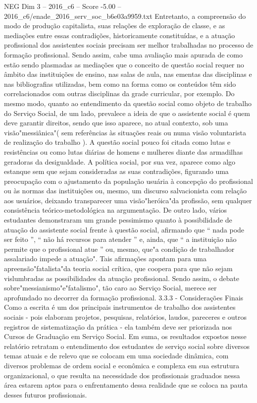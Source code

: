 \begin{textsample}{NEG Dim 3 – 2016\_c6 – Score -5.00 – 2016\_c6/enade\_2016\_serv\_soc\_b6e03a9959.txt}
Entretanto, a compreensão do modo de produção capitalista, suas relações de exploração de classe, e as mediações entre essas contradições, historicamente constituídas, e a atuação profissional dos assistentes sociais precisam ser melhor trabalhadas no processo de formação profissional.
Sendo assim, cabe uma avaliação mais apurada de como estão sendo plasmadas as mediações que o conceito de questão social requer no âmbito das instituições de ensino, nas salas de aula, nas ementas das disciplinas e nas bibliografias utilizadas, bem como na forma como os conteúdos têm sido correlacionados com outras disciplinas da grade curricular, por exemplo.
Do mesmo modo, quanto ao entendimento da questão social como objeto de trabalho do Serviço Social, de um lado, prevalece a ideia de que o assistente social é quem deve garantir direitos, sendo que isso aparece, no atual contexto, sob uma visão"messiânica"( sem referências às situações reais ou numa visão voluntarista de realização do trabalho ).
A questão social pouco foi citada como lutas e resistências ou como lutas diárias de homens e mulheres diante das armadilhas geradoras da desigualdade.
A política social, por sua vez, aparece como algo estanque sem que sejam consideradas as suas contradições, figurando uma preocupação com o ajustamento da população usuária à concepção do profissional ou às normas das instituições ou, mesmo, um discurso salvacionista com relação aos usuários, deixando transparecer uma visão"heróica"da profissão, sem qualquer consistência teórico-metodológica na argumentação.
De outro lado, vários estudantes demonstraram um grande pessimismo quanto à possibilidade de atuação do assistente social frente à questão social, afirmando que “ nada pode ser feito ”, “ não há recursos para atender ” e, ainda, que “ a instituição não permite que o profissional atue ” ou, mesmo, que"a condição de trabalhador assalariado impede a atuação".
Tais afirmações apontam para uma apreensão"fatalista"da teoria social crítica, que coopera para que não sejam vislumbradas as possibilidades da atuação profissional.
Sendo assim, o debate sobre"messianismo"e"fatalismo", tão caro ao Serviço Social, merece ser aprofundado no decorrer da formação profissional. 3.3.3 - Considerações Finais Como a escrita é um dos principais instrumentos de trabalho dos assistentes sociais - pois elaboram projetos, pesquisas, relatórios, laudos, pareceres e outros registros de sistematização da prática - ela também deve ser priorizada nos Cursos de Graduação em Serviço Social.
Em suma, os resultados expostos nesse relatório retratam o entendimento dos estudantes de serviço social sobre diversos temas atuais e de relevo que se colocam em uma sociedade dinâmica, com diversos problemas de ordem social e econômica e complexa em sua estrutura organizacional, o que resulta na necessidade dos profissionais graduados nessa área estarem aptos para o enfrentamento dessa realidade que se coloca na pauta desses futuros profissionais.

\end{textsample}

